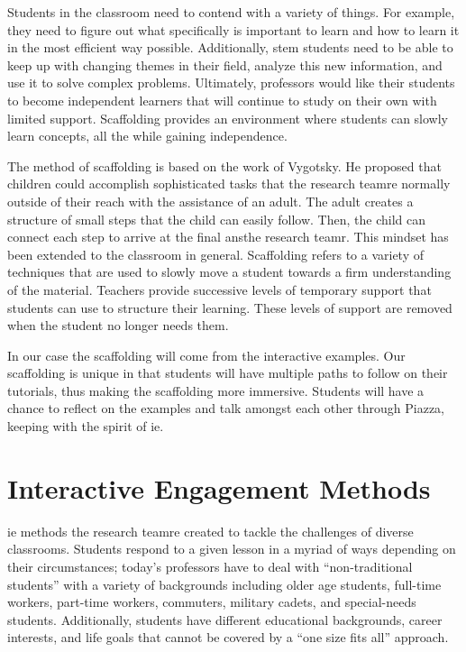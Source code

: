 Students in the classroom need to contend with a variety of things. For example, they need to figure out what specifically is important to learn and how to learn it in the most efficient way possible. Additionally, \gls{stem} students need to be able to keep up with changing themes in their field, analyze this new information, and use it to solve complex problems. Ultimately, professors would like their students to become independent learners that will continue to study on their own with limited support. Scaffolding provides an environment where students can slowly learn concepts, all the while gaining independence\cite{larkin2002}.

The method of scaffolding is based on the work of Vygotsky. He proposed that children could accomplish sophisticated tasks that the research teamre normally outside of their reach with the assistance of an adult. The adult creates a structure of small steps that the child can easily follow. Then, the child can connect each step to arrive at the final ansthe research teamr. This mindset has been extended to the classroom in general. Scaffolding refers to a variety of techniques that are used to slowly move a student towards a firm understanding of the material. Teachers provide successive levels of temporary support that students can use to structure their learning. These levels of support are removed when the student no longer needs them.

In our case the scaffolding will come from the interactive examples. Our scaffolding is unique in that students will have multiple paths to follow on their tutorials, thus making the scaffolding more immersive. Students will have a chance to reflect on the examples and talk amongst each other through Piazza, keeping with the spirit of \gls{ie}.

\section{Interactive Engagement Methods}

\gls{ie} methods the research teamre created to tackle the challenges of diverse classrooms. Students respond to a given lesson in a myriad of ways depending on their circumstances; today's professors have to deal with ``non-traditional students'' with a variety of backgrounds including older age students, full-time workers, part-time workers, commuters, military cadets, and special-needs students. Additionally, students have different educational backgrounds, career interests, and life goals that cannot be covered by a ``one size fits all'' approach\cite{novak1999}.

